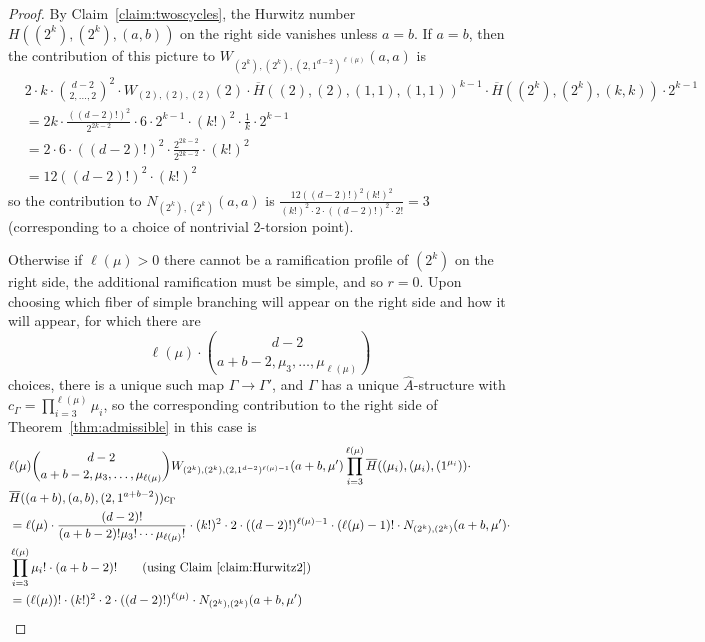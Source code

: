 \documentclass[thesis]{thesis-umich}           %
\theoremstyle{definition}
\begin{document}
\begin{proof}

    By Claim~\ref{claim:twoscycles}, the Hurwitz number $H((2^k),(2^k),(a,b))$ on the right
    side vanishes unless $a=b$.
    If $a=b$, then the contribution of this picture to $W_{(2^k),(2^k),(2,1^{d-2})^{\ell(\mu)}}(a,a)$ is
    \begin{align*}
      &2\cdot k\cdot \binom{d-2}{2,\dots,2}^2\cdot W_{(2),(2),(2)}(2)\cdot \overline H((2),(2),(1,1),(1,1))^{k-1}\cdot \overline H((2^k),(2^k),(k,k))\cdot 2^{k-1} \\
      &=2k\cdot\frac{((d-2)!)^2}{2^{2k-2}}\cdot 6\cdot 2^{k-1}\cdot (k!)^2\cdot\frac 1k\cdot 2^{k-1} \\
      &=2\cdot 6\cdot ((d-2)!)^2\cdot\frac{2^{2k-2}}{2^{2k-2}}\cdot (k!)^2 \\
      &=12((d-2)!)^2\cdot (k!)^2
      \end{align*}
    so the contribution to $N_{(2^k),(2^k)}(a,a)$ is
    $\frac{12((d-2)!)^2(k!)^2}{(k!)^2\cdot 2\cdot ((d-2)!)^2\cdot 2!}=3$ (corresponding to a choice of nontrivial 2-torsion point).
  
  Otherwise if $\ell(\mu)>0$ there cannot be a ramification profile of $(2^k)$
  on the right side, the additional ramification must be simple, and so $r=0$.
  Upon
  choosing which fiber of simple branching will appear on the right side and how it will appear,
  for which there are
  \[
  \ell(\mu)\cdot \binom{d-2}{a+b-2,\mu_3,\dots,\mu_{\ell(\mu)}}
  \]
  choices, there is a unique such map $\Gamma\to\Gamma'$, and $\Gamma$ has a unique $\hat A$-structure
  with $c_{\Gamma}=\prod\limits_{i=3}^{\ell(\mu)}\mu_i$, so the corresponding contribution to the right side of Theorem~\ref{thm:admissible} in this case is
  \begin{align*}
    &\ell(\mu)\binom{d-2}{a+b-2,\mu_3,\dots,\mu_{\ell(\mu)}} W_{(2^k),(2^k),(2,1^{d-2})^{\ell(\mu)-1}}(a+b,\mu') \prod_{i=3}^{\ell(\mu)}\overline H((\mu_i),(\mu_i),(1^{\mu_i})) \cdot \\
    &\overline H((a+b),(a,b),(2,1^{a+b-2})) c_{\Gamma} \\
    &=\ell(\mu)\cdot\frac{(d-2)!}{(a+b-2)!\mu_3!\cdots\mu_{\ell(\mu)}!}\cdot (k!)^2\cdot 2\cdot((d-2)!)^{\ell(\mu)-1}\cdot (\ell(\mu)-1)!\cdot N_{(2^k),(2^k)}(a+b,\mu')\cdot \\
    &\prod_{i=3}^{\ell(\mu)}\mu_i!\cdot (a+b-2)! \tag*{(using Claim~\ref{claim:Hurwitz2})} \\
    &=(\ell(\mu))!\cdot (k!)^2\cdot 2\cdot((d-2)!)^{\ell(\mu)}\cdot N_{(2^k),(2^k)}(a+b,\mu') \\
  \end{align*}


\end{proof}
\end{document}
